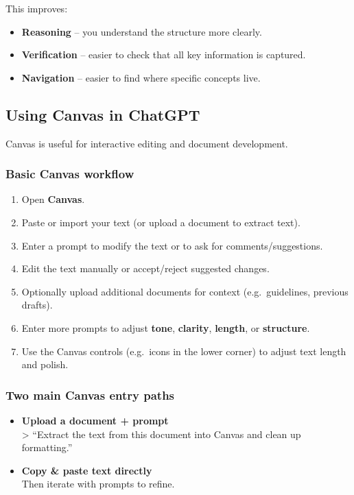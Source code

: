 \documentclass[
  letterpaper,
  DIV=11,
  numbers=noendperiod]{scrreprt}
\providecommand{\tightlist}{%
  \setlength{\itemsep}{0pt}\setlength{\parskip}{0pt}}
\begin{document}
This improves:

\begin{itemize}
\tightlist
\item
  \textbf{Reasoning} -- you understand the structure more clearly.
\item
  \textbf{Verification} -- easier to check that all key information is
  captured.
\item
  \textbf{Navigation} -- easier to find where specific concepts live.
\end{itemize}

\subsection{Using Canvas in ChatGPT}\label{using-canvas-in-chatgpt}

Canvas is useful for interactive editing and document development.

\subsubsection{Basic Canvas workflow}\label{basic-canvas-workflow}

\begin{enumerate}
\def\labelenumi{\arabic{enumi}.}
\tightlist
\item
  Open \textbf{Canvas}.
\item
  Paste or import your text (or upload a document to extract text).
\item
  Enter a prompt to modify the text or to ask for comments/suggestions.
\item
  Edit the text manually or accept/reject suggested changes.
\item
  Optionally upload additional documents for context (e.g.~guidelines,
  previous drafts).
\item
  Enter more prompts to adjust \textbf{tone}, \textbf{clarity},
  \textbf{length}, or \textbf{structure}.
\item
  Use the Canvas controls (e.g.~icons in the lower corner) to adjust
  text length and polish.
\end{enumerate}

\subsubsection{Two main Canvas entry
paths}\label{two-main-canvas-entry-paths}

\begin{itemize}
\tightlist
\item
  \textbf{Upload a document + prompt}\\
  \textgreater{} ``Extract the text from this document into Canvas and
  clean up formatting.''
\item
  \textbf{Copy \& paste text directly}\\
  Then iterate with prompts to refine.
\end{itemize}
\end{document}
